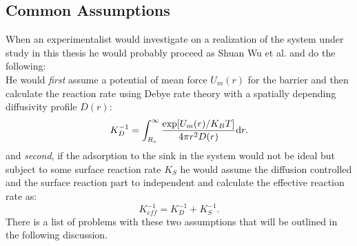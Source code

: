 \subsection{Common Assumptions}
When an experimentalist would investigate on a realization of the system under study in this thesis he would probably proceed as Shuan Wu et al. \cite{Wu2012a} and do the following: \\ 
He would \emph{first} assume a potential of mean force $U_m(r)$ for the barrier and then calculate the reaction rate using Debye rate theory with a spatially depending diffusivity profile $D(r)$:
\begin{equation}
    K_D^{-1} = \int_{R_s}^{\infty}\frac{\exp[U_m(r)/K_B T]}{4 \pi r^{2} D(r)} {\rm d} r.
    \label{YSDebye}
\end{equation}
and \emph{second}, if the adsorption to the sink in the system would not be ideal but subject to some surface reaction rate $K_S$ he would assume the diffusion controlled and the surface reaction part to independent and calculate the effective reaction rate as:
\begin{equation}
    K_{eff}^{-1} = K_D^{-1} + K_S^{-1}.
    \label{Keff}
\end{equation}
There is a list of problems with these two assumptions that will be outlined in the following discussion. \\
